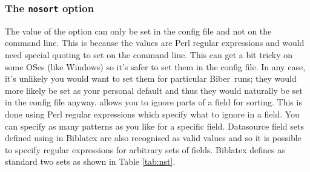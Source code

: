 \documentclass{ltxdockit}
\newcommand*{\biber}{Biber\xspace}
\newcommand*{\biblatex}{Biblatex\xspace}
\begin{document}
\subsubsection{The \texttt{nosort} option}\label{nosort}

The value of the  option can only be set in the config file
and not on the command line. This is because the values are Perl regular
expressions and would need special quoting to set on the command line. This
can get a bit tricky on some OSes (like Windows) so it's safer to set them
in the config file. In any case, it's unlikely you would want to set them
for particular \biber\ runs; they would more likely be set as your
personal default and thus they would naturally be set in the config file
anyway.  allows you to ignore parts of a field for sorting.
This is done using Perl regular expressions which specify what to
ignore in a field. You can specify as many patterns as you like for a
specific field. Datasource field sets defined using
 in \biblatex are also recognised as valid
values and so it is possible to specify  regular expressions for
arbitrary sets of fields. \biblatex defines as standard two sets as shown
in Table \ref{tab:nst}.
\end{document}
